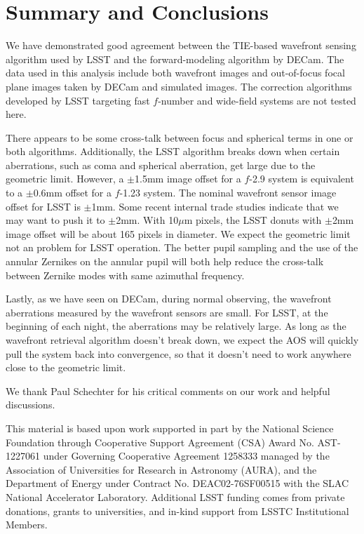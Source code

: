 \documentclass[]{spie}  %
\begin{document}
\section{Summary and Conclusions}
\label{sec:summary}

We have demonstrated good agreement between the TIE-based wavefront sensing algorithm used by LSST 
and the forward-modeling algorithm by DECam.
The data used in this analysis include
both wavefront images and out-of-focus focal plane images taken by DECam and simulated images.
The correction algorithms developed by LSST targeting fast $f$-number and wide-field systems are not tested here.

There appears to be some cross-talk between focus and spherical terms in one or both algorithms.
Additionally, the LSST algorithm breaks down when certain aberrations,
such as coma and spherical aberration, get large due to the geometric limit.
However, 
a $\pm$1.5mm image offset for a $f$-2.9 system is equivalent to a $\pm$0.6mm offset for a $f$-1.23 system.
The nominal wavefront sensor image offset for LSST is $\pm$1mm. Some recent internal trade studies indicate that we may want to push it to $\pm$2mm. With 10$\mu$m pixels, the LSST donuts with $\pm$2mm image offset will be about 165 pixels in diameter.
We expect the geometric limit not an problem for LSST operation.
The better pupil sampling and the use of the annular Zernikes on the annular pupil will both help reduce the cross-talk between Zernike modes with same azimuthal frequency.

Lastly, as we have seen on DECam, during normal observing, the wavefront aberrations measured by the wavefront sensors are small.
For LSST, at the beginning of each night, the aberrations may be relatively large.
As long as the wavefront retrieval algorithm doesn't break down, we expect the AOS will quickly pull the system back into convergence, so that it doesn't need to work anywhere close to the geometric limit.


\acknowledgments %

We thank Paul Schechter for his critical comments on our work and helpful discussions.
 
This material is based upon work supported in part by the National Science Foundation through Cooperative Support Agreement (CSA) Award No. AST-1227061 under Governing Cooperative Agreement 1258333 managed by the Association of Universities for Research in Astronomy (AURA), and the Department of Energy under Contract No. DEAC02-76SF00515 with the SLAC National Accelerator Laboratory. Additional LSST funding comes from private donations, grants to universities, and in-kind support from LSSTC Institutional Members.

\def\pasp{Publications of the Astronomical Society of the Pacific}%

\end{document}
